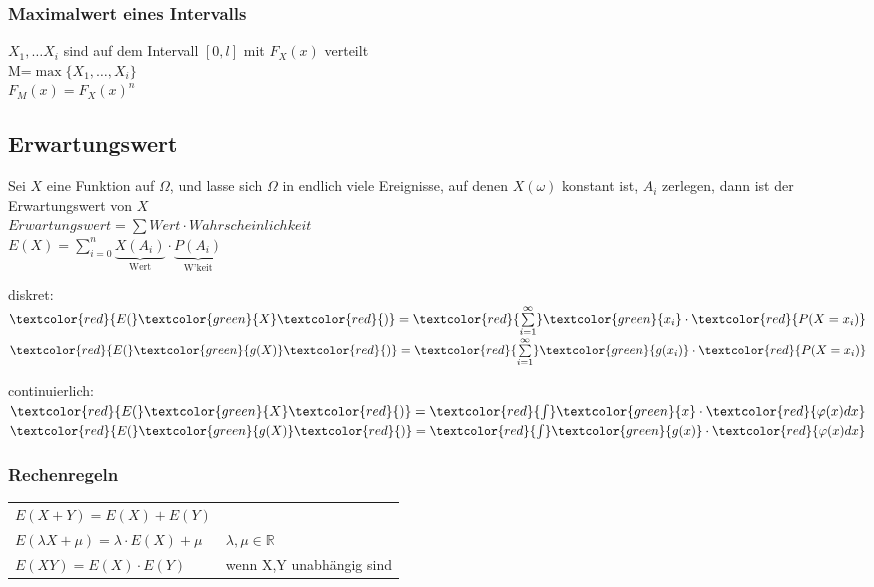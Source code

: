 	\subsubsection{Maximalwert eines Intervalls }
	$X_1,\ldots X_i$ sind auf dem Intervall $[0,l]$ mit $F_X(x)$ verteilt\\
	M=$\max \{ X_1,\ldots,X_i\} $\\
	$F_M(x)=F_X(x)^n$\\

\subsection{Erwartungswert  }
	Sei $X$ eine Funktion auf $\Omega$, und lasse sich $\Omega$ in endlich viele
	Ereignisse, auf denen $X(\omega)$ konstant ist, $A_i$ zerlegen, dann ist der
	Erwartungswert von $X$\\
		$Erwartungswert = \sum Wert \cdot Wahrscheinlichkeit$\\
		$E(X)=\sum\limits_{i=0}^n \underbrace{X(A_i)}_{\text{Wert}}\cdot \underbrace{P(A_i)}_{\text{W'keit}}$\\
	\begin{minipage}{10cm}
			diskret:\\
		$\textcolor{red}{E(}\textcolor{green}{X}\textcolor{red}{)}=\textcolor{red}{\sum\limits_{i=1}^\infty} \textcolor{green}{x_i} \cdot \textcolor{red}{ P(X=x_i)}$\\
		$\textcolor{red}{E(}\textcolor{green}{g(X)}\textcolor{red}{)}=\textcolor{red}{\sum\limits_{i=1}^\infty} \textcolor{green}{g(x_i)} \cdot \textcolor{red}{ P(X=x_i)}$\\
	\end{minipage}
	\begin{minipage}{10cm}
	
		continuierlich:\\
        $\textcolor{red}{E(}\textcolor{green}{X}\textcolor{red}{)}=	\textcolor{red}{\int} \textcolor{green}{x} \cdot \textcolor{red}{\varphi(x)dx}$\\
        $\textcolor{red}{E(}\textcolor{green}{g(X)}\textcolor{red}{)}=	\textcolor{red}{\int} \textcolor{green}{g(x)} \cdot \textcolor{red}{\varphi(x)dx}$\\
	
	\end{minipage}
	\subsubsection{Rechenregeln}
		\begin{tabular}{ll}
		$E(X+Y)=E(X)+E(Y)$\\
		$E(\lambda X + \mu)=\lambda \cdot E(X) + \mu$ & $\lambda, \mu \in \mathbb{R}$\\
		$E(XY) = E(X)\cdot E(Y)$ & wenn X,Y unabhängig sind\\
		\end{tabular}\\
